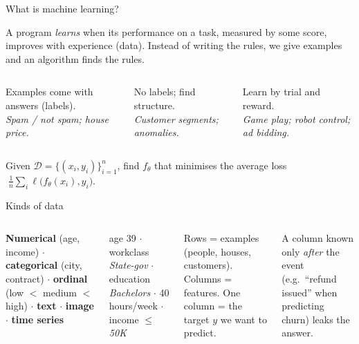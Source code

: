 \documentclass[aspectratio=169,11pt]{beamer}
\begin{document}

\begin{frame}{What is machine learning?}
\begin{bdef}
A program \emph{learns} when its performance on a task, measured by some score, improves with experience (data). Instead of writing the rules, we give examples and an algorithm finds the rules.
\end{bdef}
\begin{columns}[T]
\begin{bex}[Supervised]
Examples come with answers (labels).\\ \emph{Spam / not spam; house price.}
\end{bex}
\begin{bex}[Unsupervised]
No labels; find structure.\\ \emph{Customer segments; anomalies.}
\end{bex}
\begin{bex}[Reinforcement]
Learn by trial and reward.\\ \emph{Game play; robot control; ad bidding.}
\end{bex}
\end{columns}
\begin{bmath}
Given $\mathcal{D}=\{(x_i,y_i)\}_{i=1}^{n}$, find $f_\theta$ that minimises the average loss $\;\frac1n\sum_i \ell\big(f_\theta(x_i),y_i\big)$.
\end{bmath}
\end{frame}

\begin{frame}{Kinds of data}
\begin{columns}[T]
\begin{bdef}
\textbf{Numerical} (age, income) $\cdot$ \textbf{categorical} (city, contract) $\cdot$ \textbf{ordinal} (low $<$ medium $<$ high) $\cdot$ \textbf{text} $\cdot$ \textbf{image} $\cdot$ \textbf{time series}
\end{bdef}
\begin{bex}
age 39 $\cdot$ workclass \emph{State-gov} $\cdot$ education \emph{Bachelors} $\cdot$ 40 hours/week $\cdot$ income \emph{$\le$50K}
\end{bex}
\begin{bdef}
Rows = examples (people, houses, customers). Columns = features. One column = the target $y$ we want to predict.
\end{bdef}
\begin{bwarn}
A column known only \emph{after} the event (e.g.\ ``refund issued'' when predicting churn) leaks the answer.
\end{bwarn}
\end{columns}
\end{frame}
\end{document}
